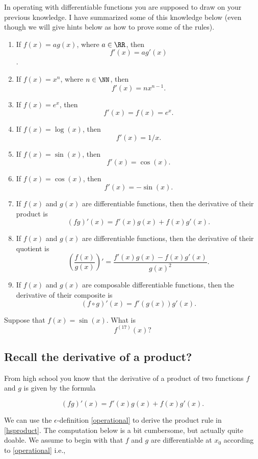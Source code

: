 \documentclass{article}
\begin{document}
\begin{remark}[emph]

In operating with differentiable functions you are supposed to draw on
your previous knowledge. I have summarized some of this knowledge below (even though we will give hints below as how to prove some of the rules).


  \begin{enumerate}
\item
  If $f(x) = a g(x)$, where $a\in \RR$, then
  $$f'(x) = a g'(x)$$.
\item
If $f(x) = x^n$, where $n \in \NN$, then $$f'(x) = n x^{n-1}.$$
\item 
If $f(x) = e^x$, then  $$f'(x) = f(x) = e^x.$$
\item
If $f(x) = \log(x)$, then $$f'(x) = 1/x.$$
\item
If $f(x) = \sin(x)$, then $$f'(x) = \cos(x).$$
\item
If $f(x) = \cos(x)$, then $$f'(x) = -\sin(x).$$
\item
  If $f(x)$ and $g(x)$ are differentiable functions, then the derivative of their product is
  $$
  (f g)'(x) = f'(x) g(x) + f(x) g'(x).
  $$
\item
   If $f(x)$ and $g(x)$ are differentiable functions, then the derivative of their quotient is
  $$
  \left(\frac{f(x)}{g(x)}\right)' = \frac{f'(x) g(x) - f(x) g'(x)}{g(x)^2}.
  $$
\item
     If $f(x)$ and $g(x)$ are composable differentiable functions, then the derivative of their composite is
  $$
  (f\circ g)'(x) = f'(g(x)) g'(x).
  $$ 
\end{enumerate}
\end{remark}

\beginshex
Suppose that $f(x) = \sin(x)$. What is
$$
f^{(17)}(x)?
$$
\endshex


\subsection{Recall the derivative of a product?}

From high school you know that the derivative of a product of two functions $f$ and $g$
is given by the formula

\begin{equation}\label{hsproduct}
(f g)'(x) = f'(x) g(x) + f(x) g'(x).
\end{equation}

We can use the $\epsilon$-definition \eqref{operational} to derive the product rule
in \eqref{hsproduct}. The computation below is a bit cumbersome, but actually quite
doable. We assume to begin with that $f$ and $g$ are differentiable at $x_0$
according to \eqref{operational} i.e.,
\end{document}
